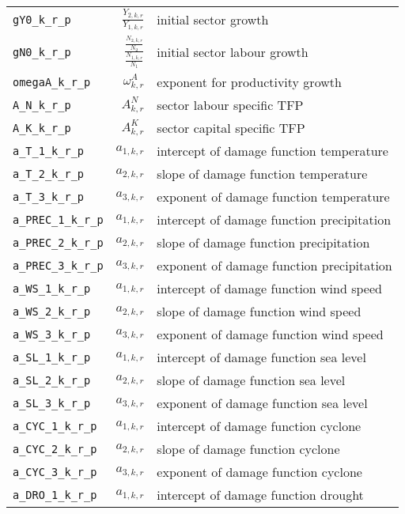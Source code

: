 \begin{center}
\begin{longtable}{lrl}
\texttt{gY0\_k\_r\_p} & ${\frac{Y_{2,k,r}}{Y_{1,k,r}}}$ & initial sector growth\\
\texttt{gN0\_k\_r\_p} & $\frac{\frac{N_{2,k,r}}{N_{2}}}{\frac{N_{1,k,r}}{N_{1}}}$ & initial sector labour growth\\
\texttt{omegaA\_k\_r\_p} & ${\omega^{A}_{k,r}}$ & exponent for productivity growth\\
\texttt{A\_N\_k\_r\_p} & ${A^{N}_{k,r}}$ & sector labour specific TFP\\
\texttt{A\_K\_k\_r\_p} & ${A^{K}_{k,r}}$ & sector capital specific TFP\\
\texttt{a\_T\_1\_k\_r\_p} & ${a_{1,k,r}}$ & intercept of damage function temperature\\
\texttt{a\_T\_2\_k\_r\_p} & ${a_{2,k,r}}$ & slope of damage function temperature\\
\texttt{a\_T\_3\_k\_r\_p} & ${a_{3,k,r}}$ & exponent of damage function temperature\\
\texttt{a\_PREC\_1\_k\_r\_p} & ${a_{1,k,r}}$ & intercept of damage function precipitation\\
\texttt{a\_PREC\_2\_k\_r\_p} & ${a_{2,k,r}}$ & slope of damage function precipitation\\
\texttt{a\_PREC\_3\_k\_r\_p} & ${a_{3,k,r}}$ & exponent of damage function precipitation\\
\texttt{a\_WS\_1\_k\_r\_p} & ${a_{1,k,r}}$ & intercept of damage function wind speed\\
\texttt{a\_WS\_2\_k\_r\_p} & ${a_{2,k,r}}$ & slope of damage function wind speed\\
\texttt{a\_WS\_3\_k\_r\_p} & ${a_{3,k,r}}$ & exponent of damage function wind speed\\
\texttt{a\_SL\_1\_k\_r\_p} & ${a_{1,k,r}}$ & intercept of damage function sea level\\
\texttt{a\_SL\_2\_k\_r\_p} & ${a_{2,k,r}}$ & slope of damage function sea level\\
\texttt{a\_SL\_3\_k\_r\_p} & ${a_{3,k,r}}$ & exponent of damage function sea level\\
\texttt{a\_CYC\_1\_k\_r\_p} & ${a_{1,k,r}}$ & intercept of damage function cyclone\\
\texttt{a\_CYC\_2\_k\_r\_p} & ${a_{2,k,r}}$ & slope of damage function cyclone\\
\texttt{a\_CYC\_3\_k\_r\_p} & ${a_{3,k,r}}$ & exponent of damage function cyclone\\
\texttt{a\_DRO\_1\_k\_r\_p} & ${a_{1,k,r}}$ & intercept of damage function drought\\

\end{longtable}
\end{center}
